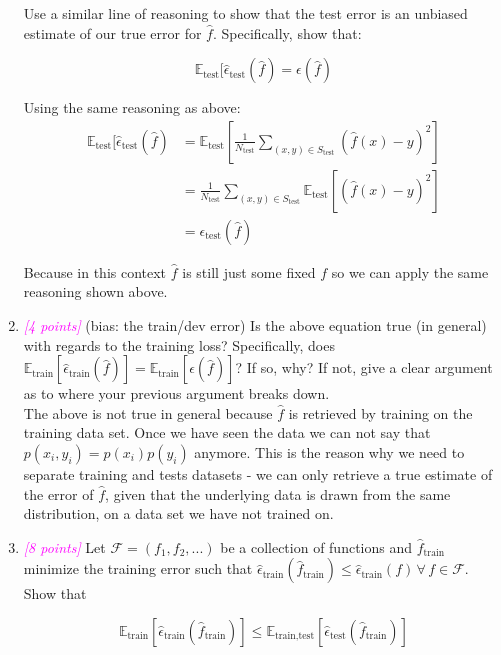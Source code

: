 \documentclass{article}
\newcommand{\1}{\mathbf{1}}
\newcommand{\E}{\mathbb{E}}
\newcommand{\points}[1]{\small\textcolor{magenta}{\emph{[#1 points]}} \normalsize}
\begin{document}
\begin{enumerate}
    Use a similar line of reasoning to show that the test error is an unbiased estimate of our true error for $\hat f$. Specifically, show that: 
    
    $$\E_\text{test}[\widehat\epsilon_\text{test}(\hat f) = \epsilon(\hat f)$$
    
    Using the same reasoning as above:
    \begin{align*}
    \E_\text{test}[\widehat\epsilon_\text{test}(\hat f) &= \E_\text{test}\left[ \frac{1}{N_\text{test}} \sum_{(x,y)\in S_\text{test}} (\hat f(x)-y)^2 \right]    \\
    &= \frac{1}{N_\text{test}} \sum_{(x,y)\in S_\text{test}} \E_\text{test}\left[ (\hat f(x)-y)^2 \right] \\
    &=  \epsilon_\text{test}(\hat f)
    \end{align*}{}
    
    Because in this context $\hat f$ is still just some fixed $f$ so we can apply the same reasoning shown above. 
    
    \item\points{4} (bias: the train/dev error) Is the above equation true (in general) with regards to the training loss? Specifically, does $\E_\text{train}[\widehat\epsilon_\text{train}(\hat f)] = \E_\text{train}[\epsilon(\hat f)]$? If so, why? If not, give a clear argument as to where your previous argument breaks down. \\
    
    The above is not true in general because $\hat f$ is retrieved by training on the training data set. Once we have seen the data we can not say that $p(x_i,y_i) = p(x_i)p(y_i)$ anymore. This is the reason why we need to separate training and tests datasets - we can only retrieve a true estimate of the error of $\hat f$, given that the underlying data is drawn from the same distribution, on a data set we have not trained on. 
    
    \item\points{8} Let $\mathcal{F} = (f_1, f_2,...)$ be a collection of functions and $\hat f_\text{train}$ minimize the training error such that $\widehat\epsilon_\text{train}(\hat f_\text{train}) \leq \widehat\epsilon_\text{train}(f)\,\forall\,f \in \mathcal{F}$. Show that 
    
    $$\E_\text{train}[\widehat\epsilon_\text{train}(\hat f_\text{train})] \leq \E_\text{train,test}[\widehat\epsilon_\text{test}(\hat f_\text{train})]$$
    

\end{enumerate}
\end{document}
